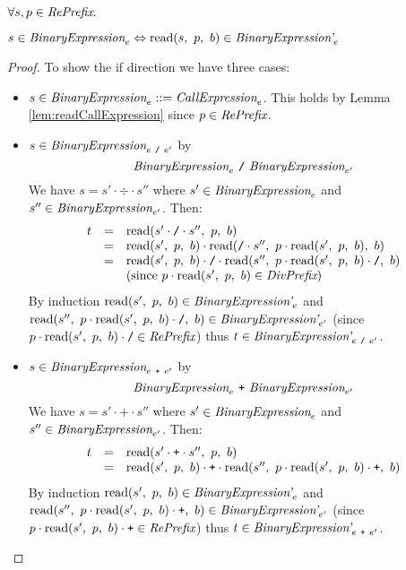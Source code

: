 \documentclass[preprint,10pt]{sigplanconf}
\begin{document}
\begin{lemma}\mbox{}
  
  \( \forall s, p \in \textit{RePrefix}. \)
 
  \( s \in \textit{BinaryExpression}_{e} \Leftrightarrow 
  \textrm{read}(s,~p,~b) \in \textit{BinaryExpression'}_{e} \)
\end{lemma}
\begin{proof}
  To show the if direction we have three cases:
  \begin{itemize}
  \item \( s \in \textit{BinaryExpression}_{e} ::=
    \textit{CallExpression}_{e} \). This holds by Lemma
    \ref{lem:readCallExpression} since \( p \in \textit{RePrefix} \).

  \item \( s \in \textit{BinaryExpression}_{e~\texttt{/}~e'} \) by 
    \[
    \textit{BinaryExpression}_{e} ~\texttt{/}~ \textit{BinaryExpression}_{e'} 
    \]
    We have \( s = s' \cdot \div \cdot s'' \) where \( s' \in
    \textit{BinaryExpression}_{e} \) and \( s'' \in
    \textit{BinaryExpression}_{e'} \). Then:
    \[
    \begin{array}{rcl}
      t &=& \textrm{read}(s'\cdot \texttt{/} \cdot s'',~p,~b)
      \\
      &=& 
      \textrm{read}(s',~p,~b) \cdot 
      \textrm{read}(\texttt{/} \cdot s'',~
        p \cdot \textrm{read}(s',~p,~b)
      ,~b)
      \\
      &=& \textrm{read}(s',~p,~b) \cdot \texttt{/} \cdot 
      \textrm{read}(s'',~
        p \cdot \textrm{read}(s',~p,~b) \cdot \texttt{/}
      ,~b)
      \\ 
      && \textrm{(since \( p \cdot \textrm{read}(s',~p,~b) \in \textit{DivPrefix}\))}
    \end{array}
    \]
    By induction \( \textrm{read}(s',~p,~b) \in \textit{BinaryExpression'}_{e} \)
    and \( 
      \textrm{read}(s'',~
        p \cdot \textrm{read}(s',~p,~b) \cdot \texttt{/}
      ,~b) \in \textit{BinaryExpression'}_{e'}
      \) (since \( p \cdot \textrm{read}(s',~p,~b) \cdot \texttt{/} \in \textit{RePrefix} \)) thus \( t \in \textit{BinaryExpression'}_{e~\texttt{/}~e'} \).

  \item \( s \in \textit{BinaryExpression}_{e~\texttt{+}~e'} \) by 
    \[
    \textit{BinaryExpression}_{e} ~\texttt{+}~ \textit{BinaryExpression}_{e'} 
    \]
    We have \( s = s' \cdot \texttt{+} \cdot s'' \) where \( s' \in
    \textit{BinaryExpression}_{e} \) and \( s'' \in
    \textit{BinaryExpression}_{e'} \). Then:
    \[
    \begin{array}{rcl}
      t &=& \textrm{read}(s'\cdot \texttt{+} \cdot s'',~p,~b)
      \\
      &=& \textrm{read}(s',~p,~b) \cdot \texttt{+} \cdot 
      \textrm{read}(s'',~
        p \cdot \textrm{read}(s',~p,~b) \cdot \texttt{+}
      ,~b)
    \end{array}
    \]
    By induction \( \textrm{read}(s',~p,~b) \in \textit{BinaryExpression'}_{e}
    \) and \( \textrm{read}(s'',~ p \cdot \textrm{read}(s',~p,~b) \cdot \texttt{+}
    ,~b) \in \textit{BinaryExpression'}_{e'} \) (since \( p \cdot
    \textrm{read}(s',~p,~b) \cdot \texttt{+} \in \textit{RePrefix} \)) thus \( t \in
    \textit{BinaryExpression'}_{e~\texttt{+}~e'} \).
  \end{itemize}
\end{proof}
\end{document}
